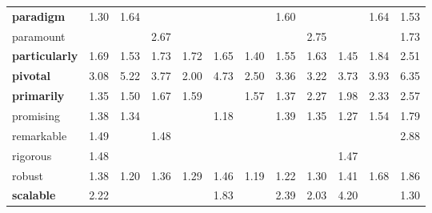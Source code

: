 \begin{tabular}{|l|c|c|c|c|c|c|c|c|c|c|c|}
\textbf{paradigm} & \cellcolor{green!14} 1.30 & \cellcolor{green!27} 1.64 &  &  &  &  & \cellcolor{green!26} 1.60 &  &  & \cellcolor{green!27} 1.64 & \cellcolor{green!23} 1.53 \\
paramount &  &  & \cellcolor{green!54} 2.67 &  &  &  &  & \cellcolor{green!56} 2.75 &  &  & \cellcolor{green!30} 1.73 \\
\textbf{particularly} & \cellcolor{green!29} 1.69 & \cellcolor{green!23} 1.53 & \cellcolor{green!30} 1.73 & \cellcolor{green!30} 1.72 & \cellcolor{green!27} 1.65 & \cellcolor{green!18} 1.40 & \cellcolor{green!24} 1.55 & \cellcolor{green!27} 1.63 & \cellcolor{green!20} 1.45 & \cellcolor{green!34} 1.84 & \cellcolor{green!51} 2.51 \\
\textbf{pivotal} & \cellcolor{green!62} 3.08 & \cellcolor{green!92} 5.22 & \cellcolor{green!74} 3.77 & \cellcolor{green!38} 2.00 & \cellcolor{green!86} 4.73 & \cellcolor{green!51} 2.50 & \cellcolor{green!67} 3.36 & \cellcolor{green!65} 3.22 & \cellcolor{green!73} 3.73 & \cellcolor{green!76} 3.93 & \cellcolor{green!100} 6.35 \\
\textbf{primarily} & \cellcolor{green!16} 1.35 & \cellcolor{green!22} 1.50 & \cellcolor{green!28} 1.67 & \cellcolor{green!25} 1.59 &  & \cellcolor{green!25} 1.57 & \cellcolor{green!17} 1.37 & \cellcolor{green!45} 2.27 & \cellcolor{green!38} 1.98 & \cellcolor{green!47} 2.33 & \cellcolor{green!52} 2.57 \\
promising & \cellcolor{green!17} 1.38 & \cellcolor{green!16} 1.34 &  &  & \cellcolor{green!9} 1.18 &  & \cellcolor{green!18} 1.39 & \cellcolor{green!16} 1.35 & \cellcolor{green!13} 1.27 & \cellcolor{green!24} 1.54 & \cellcolor{green!32} 1.79 \\
remarkable & \cellcolor{green!22} 1.49 &  & \cellcolor{green!21} 1.48 &  &  &  &  &  &  &  & \cellcolor{green!59} 2.88 \\
rigorous & \cellcolor{green!21} 1.48 &  &  &  &  &  &  &  & \cellcolor{green!21} 1.47 &  &  \\
robust & \cellcolor{green!17} 1.38 & \cellcolor{green!10} 1.20 & \cellcolor{green!17} 1.36 & \cellcolor{green!14} 1.29 & \cellcolor{green!21} 1.46 & \cellcolor{green!9} 1.19 & \cellcolor{green!11} 1.22 & \cellcolor{green!14} 1.30 & \cellcolor{green!19} 1.41 & \cellcolor{green!28} 1.68 & \cellcolor{green!34} 1.86 \\
\textbf{scalable} & \cellcolor{green!44} 2.22 &  &  &  & \cellcolor{green!33} 1.83 &  & \cellcolor{green!48} 2.39 & \cellcolor{green!39} 2.03 & \cellcolor{green!80} 4.20 &  & \cellcolor{green!14} 1.30 \\

\end{tabular}
